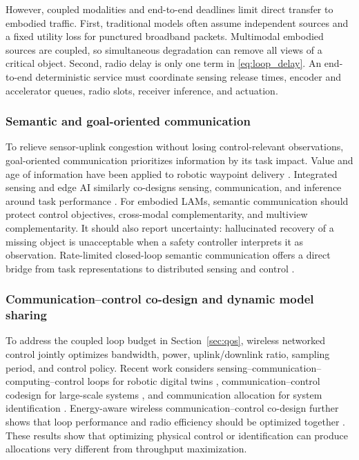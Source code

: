 \documentclass[letterpaper,journal]{IEEEtran}
\begin{document}
However, coupled modalities and end-to-end deadlines limit direct transfer
to embodied traffic.
First, traditional models often assume independent sources and a fixed
utility loss for punctured broadband packets. Multimodal embodied sources are
coupled, so simultaneous degradation can remove all views of a critical
object. Second, radio delay is only one term in
\eqref{eq:loop_delay}. An end-to-end deterministic service must coordinate
sensing release times, encoder and accelerator queues, radio slots, receiver
inference, and actuation.

\subsubsection{Semantic and goal-oriented communication}
To relieve sensor-uplink congestion without losing control-relevant
observations, goal-oriented communication prioritizes information by its
task impact.
Value and age of information have been applied to robotic waypoint delivery
\cite{waypoint}. Integrated sensing and edge AI similarly co-designs sensing,
communication, and inference around task performance \cite{isea}. For
embodied LAMs, semantic communication should protect control objectives,
cross-modal complementarity, and multiview complementarity. It should also
report uncertainty: hallucinated recovery of a missing object is unacceptable
when a safety controller interprets it as observation. Rate-limited
closed-loop semantic communication offers a direct bridge from task
representations to distributed sensing and control \cite{semanticclosedloop}.


\subsubsection{Communication--control co-design and dynamic model sharing}
To address the coupled loop budget in Section~\ref{sec:qos}, wireless
networked control jointly optimizes bandwidth, power, uplink/downlink ratio,
sampling period, and control policy. Recent work considers
sensing--communication--computing--control loops for robotic digital twins
\cite{fang}, communication--control codesign for large-scale systems
\cite{pang}, and communication allocation for system identification
\cite{systemid}. Energy-aware wireless communication--control co-design
further shows that loop performance and radio efficiency should be optimized
together \cite{energywncs}. These results show that optimizing physical
control or identification can produce allocations very different from
throughput maximization.
\end{document}
